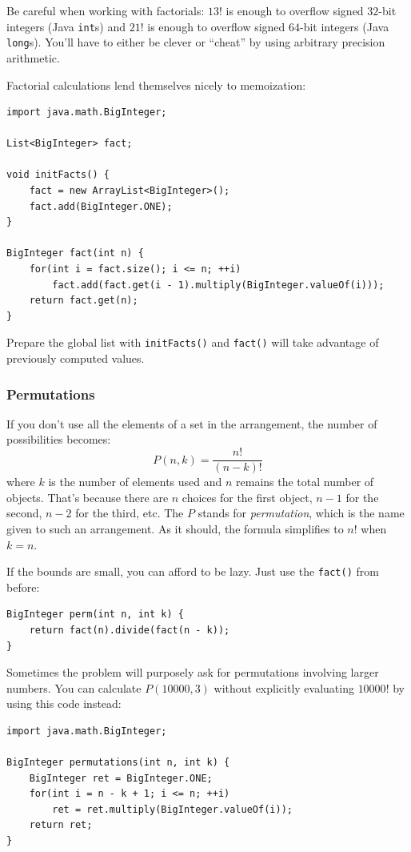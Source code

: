\documentclass[a4paper,12pt]{article}
\begin{document}
Be careful when working with factorials: $13!$ is enough to overflow signed $32$-bit integers (Java \verb/int/s) and $21!$ is enough to overflow signed $64$-bit integers (Java \verb/long/s). You'll have to either be clever or ``cheat'' by using arbitrary precision arithmetic.

Factorial calculations lend themselves nicely to memoization:

\begin{lstlisting}
import java.math.BigInteger;

List<BigInteger> fact;
	
void initFacts() {
	fact = new ArrayList<BigInteger>();
	fact.add(BigInteger.ONE);
}

BigInteger fact(int n) {
	for(int i = fact.size(); i <= n; ++i)
		fact.add(fact.get(i - 1).multiply(BigInteger.valueOf(i)));
	return fact.get(n);
}
\end{lstlisting}

Prepare the global list with \verb/initFacts()/ and \verb/fact()/ will take advantage of previously computed values.

\subsubsection{Permutations}
If you don't use all the elements of a set in the arrangement, the number of possibilities becomes:
\[P(n,k) = \frac{n!}{(n-k)!}\]
\noindent where $k$ is the number of elements used and $n$ remains the total number of objects. That's because there are $n$ choices for the first object, $n-1$ for the second, $n-2$ for the third, etc. The $P$ stands for {\em permutation}, which is the name given to such an arrangement. As it should, the formula simplifies to $n!$ when $k=n$.

If the bounds are small, you can afford to be lazy. Just use the \verb/fact()/ from before:
\begin{lstlisting}
BigInteger perm(int n, int k) {
	return fact(n).divide(fact(n - k));
}
\end{lstlisting}

\noindent Sometimes the problem will purposely ask for permutations involving larger numbers. You can calculate $P(10000,3)$ without explicitly evaluating $10000!$ by using this code instead:
\begin{lstlisting}
import java.math.BigInteger;

BigInteger permutations(int n, int k) {
	BigInteger ret = BigInteger.ONE;
	for(int i = n - k + 1; i <= n; ++i)
		ret = ret.multiply(BigInteger.valueOf(i));
	return ret;
}
\end{lstlisting}
\end{document}
